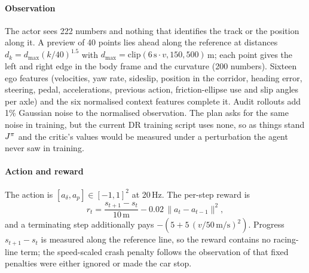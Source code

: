 \paragraph{Observation} The actor sees 222 numbers and nothing that identifies the track
or the position along it. A preview of 40 points lies ahead along the reference at
distances $d_k = d_{\max}(k/40)^{1.5}$ with $d_{\max} = \mathrm{clip}(6\,\mathrm{s}
\cdot v, 150, 500)$\,m; each point gives the left and right edge in the body frame and
the curvature (200 numbers). Sixteen ego features (velocities, yaw rate, sideslip,
position in the corridor, heading error, steering, pedal, accelerations, previous action,
friction-ellipse use and slip angles per axle) and the six normalised context features
complete it. Audit rollouts add 1\% Gaussian noise to the normalised observation. The
plan asks for the same noise in training, but the current DR training script uses none,
so as things stand $J^{\pi}$ and the critic's values would be measured under a perturbation
the agent never saw in training.

\paragraph{Action and reward} The action is $[a_\delta, a_p] \in [-1,1]^2$ at 20\,Hz.
The per-step reward is
\begin{equation}
  r_t = \frac{s_{t+1} - s_t}{10\,\text{m}} - 0.02\,\lVert a_t - a_{t-1}\rVert^2,
  \label{eq:reward}
\end{equation}
and a terminating step additionally pays $-(5 + 5\,(v/50\,\text{m/s})^2)$. Progress
$s_{t+1} - s_t$ is measured along the reference line, so the reward contains no
racing-line term; the speed-scaled crash penalty follows the observation of
\citet{fuchs2021} that fixed penalties were either ignored or made the car stop.

